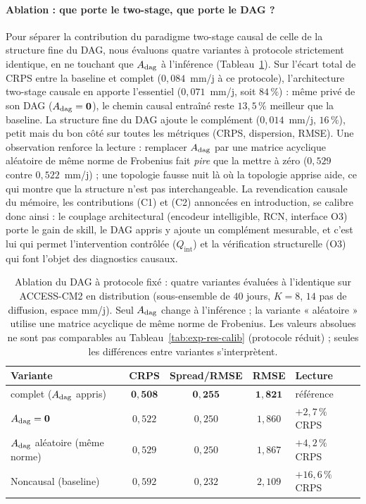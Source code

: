 \paragraph{Ablation : que porte le two-stage, que porte le DAG ?} Pour séparer la contribution du paradigme two-stage causal de celle de la structure fine du DAG, nous évaluons quatre variantes à protocole strictement identique, en ne touchant que $A_{\mathrm{dag}}$ à l'inférence (Tableau~\ref{tab:exp-ablation-dag}). Sur l'écart total de CRPS entre la baseline et \Oracle{} complet ($0{,}084$~mm/j à ce protocole), l'architecture two-stage causale en apporte l'essentiel ($0{,}071$~mm/j, soit $84\,\%$) : même privé de son DAG ($A_{\mathrm{dag}}=\mathbf{0}$), le chemin causal entraîné reste $13{,}5\,\%$ meilleur que la baseline. La structure fine du DAG ajoute le complément ($0{,}014$~mm/j, $16\,\%$), petit mais du bon côté sur toutes les métriques (CRPS, dispersion, RMSE). Une observation renforce la lecture : remplacer $A_{\mathrm{dag}}$ par une matrice acyclique aléatoire de même norme de Frobenius fait \emph{pire} que la mettre à zéro ($0{,}529$ contre $0{,}522$~mm/j) ; une topologie fausse nuit là où la topologie apprise aide, ce qui montre que la structure n'est pas interchangeable. La revendication causale du mémoire, les contributions (C1) et (C2) annoncées en introduction, se calibre donc ainsi : le couplage architectural (encodeur intelligible, RCN, interface O3) porte le gain de skill, le DAG appris y ajoute un complément mesurable, et c'est lui qui permet l'intervention contrôlée ($Q_{\mathrm{int}}$) et la vérification structurelle (O3) qui font l'objet des diagnostics causaux.

\begin{table}[H]
  \centering
  \small
  \caption[Ablation du DAG à protocole fixé]{Ablation du DAG à protocole fixé : quatre variantes évaluées à l'identique sur ACCESS-CM2 en distribution (sous-ensemble de $40$ jours, $K=8$, $14$ pas de diffusion, espace mm/j). Seul $A_{\mathrm{dag}}$ change à l'inférence ; la variante « aléatoire » utilise une matrice acyclique de même norme de Frobenius. Les valeurs absolues ne sont pas comparables au Tableau~\ref{tab:exp-res-calib} (protocole réduit) ; seules les différences entre variantes s'interprètent.}
  \label{tab:exp-ablation-dag}
  \begin{tabularx}{\linewidth}{X c c c l}
    \toprule
    \textbf{Variante} & \textbf{CRPS} & \textbf{Spread/RMSE} & \textbf{RMSE} & \textbf{Lecture} \\
    \midrule
    \Oracle{} complet ($A_{\mathrm{dag}}$ appris) & $\mathbf{0{,}508}$ & $\mathbf{0{,}255}$ & $\mathbf{1{,}821}$ & référence \\
    $A_{\mathrm{dag}} = \mathbf{0}$               & $0{,}522$ & $0{,}250$ & $1{,}860$ & $+2{,}7\,\%$ CRPS \\
    $A_{\mathrm{dag}}$ aléatoire (même norme)     & $0{,}529$ & $0{,}250$ & $1{,}867$ & $+4{,}2\,\%$ CRPS \\
    Noncausal (baseline)               & $0{,}592$ & $0{,}232$ & $2{,}109$ & $+16{,}6\,\%$ CRPS \\
    \bottomrule
  \end{tabularx}
\end{table}

